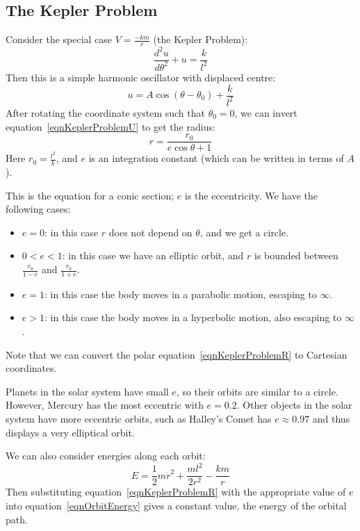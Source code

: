 \documentclass[../Main.tex]{subfiles}
\begin{document}
\subsection{The Kepler Problem}
Consider the special case $V = \frac{-km}{r}$ (the Kepler Problem):
\begin{equation*}
    \frac{d^2u}{d\theta^2} + u = \frac{k}{l^2}
\end{equation*}
Then this is a simple harmonic oscillator with displaced centre:
\begin{equation}
    u = A \cos{(\theta - \theta_0)} + \frac{k}{l^2}
    \label{eqnKeplerProblemU}
\end{equation}
After rotating the coordinate system such that $\theta_0 = 0$, we can invert equation~\ref{eqnKeplerProblemU} to get the radius:
\begin{equation}
    r = \frac{r_0}{e\cos{\theta} + 1}
    \label{eqnKeplerProblemR}
\end{equation}
Here $r_0 = \frac{l^2}{k}$, and $e$ is an integration constant (which can be written in terms of $A$).\par
This is the equation for a conic section; $e$ is the eccentricity. We have the following cases:
\begin{itemize}
    \item $e = 0$: in this case $r$ does not depend on $\theta$, and we get a circle.
    \item $0 < e < 1$: in this case we have an elliptic orbit, and $r$ is bounded between $\frac{r_0}{1-e}$ and $\frac{r_0}{1+e}$.
    \item $e = 1$: in this case the body moves in a parabolic motion, escaping to $\infty$.
    \item $e > 1$: in this case the body moves in a hyperbolic motion, also escaping to $\infty$.
\end{itemize}
Note that we can convert the polar equation~\ref{eqnKeplerProblemR} to Cartesian coordinates.\par
Planets in the solar system have small $e$, so their orbits are similar to a circle. However, Mercury has the most eccentric with $e = 0.2$. Other objects in the solar system have more eccentric orbits, such as Halley's Comet has $e \approx 0.97$ and thus displays a very elliptical orbit.\par
We can also consider energies along each orbit:
\begin{equation}
    E = \frac{1}{2}m\dot{r}^2 + \frac{ml^2}{2r^2} - \frac{km}{r}
    \label{eqnOrbitEnergy}
\end{equation}
Then substituting equation~\ref{eqnKeplerProblemR} with the appropriate value of $e$ into equation~\ref{eqnOrbitEnergy} gives a constant value, the energy of the orbital path.
\end{document}
